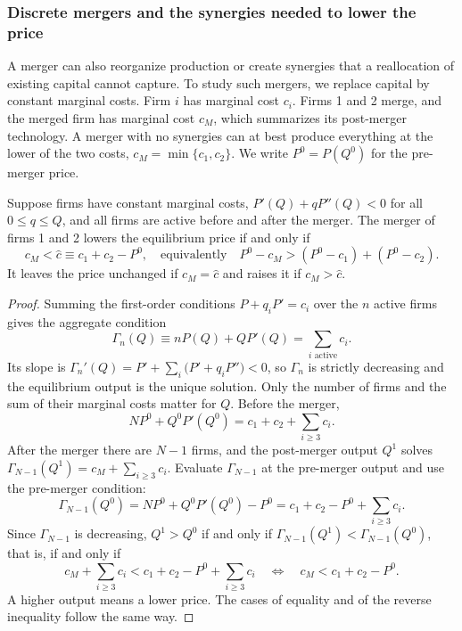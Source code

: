 \subsubsection{Discrete mergers and the synergies needed to lower the price}

A merger can also reorganize production or create synergies that a reallocation of existing capital cannot
capture. To study such mergers, we replace capital by constant marginal costs. Firm $i$ has marginal cost $c_i$.
Firms 1 and 2 merge, and the merged firm has marginal cost $c_M$, which summarizes its post-merger technology. A
merger with no synergies can at best produce everything at the lower of the two costs, $c_M = \min\{c_1, c_2\}$.
We write $P^0 = P(Q^0)$ for the pre-merger price.

\begin{proposition}\label{prop:11-synergy}
Suppose firms have constant marginal costs, $P'(Q) + qP''(Q) < 0$ for all $0 \le q \le Q$, and all firms are active
before and after the merger. The merger of firms 1 and 2 lowers the equilibrium price if and only if
\begin{equation}\label{eq:11-synergy}
c_M < \hat c \equiv c_1 + c_2 - P^0,
\quad\text{equivalently}\quad
P^0 - c_M > (P^0 - c_1) + (P^0 - c_2).
\end{equation}
It leaves the price unchanged if $c_M = \hat c$ and raises it if $c_M > \hat c$.
\end{proposition}

\begin{proof}
Summing the first-order conditions $P + q_i P' = c_i$ over the $n$ active firms gives the aggregate condition
\begin{equation*}
\Gamma_n(Q) \equiv nP(Q) + QP'(Q) = \sum_{i \text{ active}} c_i .
\end{equation*}
Its slope is $\Gamma_n'(Q) = P' + \sum_{i}\big(P' + q_i P''\big) < 0$, so $\Gamma_n$ is strictly decreasing and
the equilibrium output is the unique solution. Only the number of firms and the sum of their marginal costs
matter for $Q$. Before the merger,
\begin{equation*}
N P^0 + Q^0 P'(Q^0) = c_1 + c_2 + \sum_{i \ge 3} c_i .
\end{equation*}
After the merger there are $N - 1$ firms, and the post-merger output $Q^1$ solves
$\Gamma_{N-1}(Q^1) = c_M + \sum_{i \ge 3}c_i$. Evaluate $\Gamma_{N-1}$ at the pre-merger output and use the
pre-merger condition:
\begin{equation*}
\Gamma_{N-1}(Q^0) = N P^0 + Q^0 P'(Q^0) - P^0 = c_1 + c_2 - P^0 + \sum_{i \ge 3}c_i .
\end{equation*}
Since $\Gamma_{N-1}$ is decreasing, $Q^1 > Q^0$ if and only if
$\Gamma_{N-1}(Q^1) < \Gamma_{N-1}(Q^0)$, that is, if and only if
\begin{equation*}
c_M + \sum_{i \ge 3}c_i < c_1 + c_2 - P^0 + \sum_{i \ge 3}c_i
\quad\Longleftrightarrow\quad
c_M < c_1 + c_2 - P^0 .
\end{equation*}
A higher output means a lower price. The cases of equality and of the reverse inequality follow the same way.
\end{proof}

